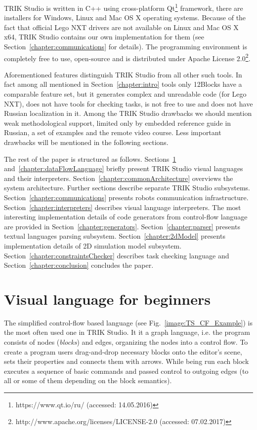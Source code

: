 \documentclass[conference]{IEEEtran}
\begin{document}
TRIK Studio is written in C++ using cross-platform Qt\footnote{https://www.qt.io/ru/ (accessed: 14.05.2016)} framework, there are installers for Windows, Linux and Mac OS X operating systems. Because of the fact that official Lego NXT drivers are not available on Linux and Mac OS X x64, TRIK Studio contains our own implementation for them (see Section~\ref{chapter:communications} for details). The programming environment is completely free to use, open-source and is distributed under Apache License 2.0\footnote{http://www.apache.org/licenses/LICENSE-2.0 (accessed: 07.02.2017)}.

Aforementioned features distinguish TRIK Studio from all other such tools. In fact among all mentioned in Section~\ref{chapter:intro} tools only 12Blocks have a comparable feature set, but it generates complex and unreadable code (for Lego NXT), does not have tools for checking tasks, is not free to use and does not have Russian localization in it. Among the TRIK Studio drawbacks we should mention weak methodological support, limited only by embedded reference guide in Russian, a set of examples and the remote video course. Less important drawbacks will be mentioned in the following sections. 

The rest of the paper is structured as follows. Sections~\ref{chapter:controlFlowLanguage} and~\ref{chapter:dataFlowLanguage} briefly present TRIK Studio visual languages and their interpreters. Section~\ref{chapter:commonArchitecture} overviews the system architecture. Further sections describe separate TRIK Studio subsystems. Section~\ref{chapter:communications} presents robots communication infrastructure. Section~\ref{chapter:interpreters} describes visual language interpreters. The most interesting implementation details of code generators from control-flow language are provided in Section~\ref{chapter:generators}. Section~\ref{chapter:parser} presents textual languages parsing subsystem. Section~\ref{chapter:2dModel} presents implementation details of 2D simulation model subsystem. Section~\ref{chapter:constraintsChecker} describes task checking language and Section~\ref{chapter:conclusion} concludes the paper.

\section{Visual language for beginners}
\label{chapter:controlFlowLanguage}

The simplified control-flow based language (see Fig.~\ref{image:TS_CF_Example}) is the most often used one in TRIK Studio. It it a graph language, i.e. the program consists of nodes (\textit{blocks}) and edges, organizing the nodes into a control flow. To create a program users drag-and-drop necessary blocks onto the editor's scene, sets their properties and connects them with arrows. While being run each block executes a sequence of basic commands and passed control to outgoing edges (to all or some of them depending on the block semantics). 
\end{document}
